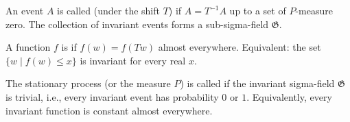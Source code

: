 An event $A$ is called  (under the shift $T$) if $A = T^{-1}A$ up to a set of $P$-measure zero. The collection of invariant events forms a sub-sigma-field $\mathfrak{G}$.

A function $f$ is  if $f(w) = f(Tw)$ almost everywhere. Equivalent: the set $\{w \mid f(w) \leq x\}$ is invariant for every real $x$.

The stationary process (or the measure $P$) is called  if the invariant sigma-field $\mathfrak{G}$ is trivial, i.e., every invariant event has probability $0$ or $1$. Equivalently, every invariant function is constant almost everywhere.
